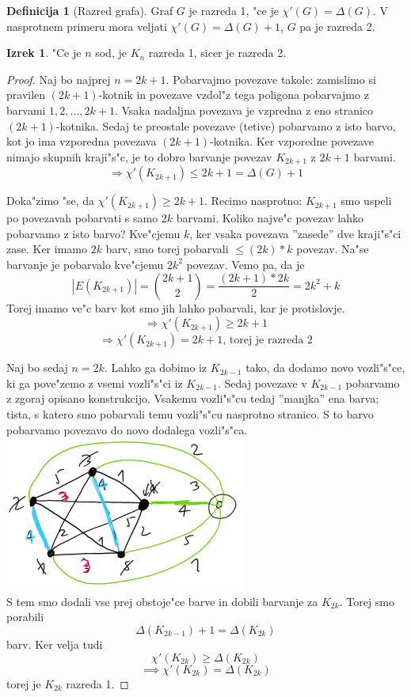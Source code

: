 \documentclass{article}
\theoremstyle{definition}
\newtheorem{definition}{Definicija}[section]
\newtheorem{theorem}{Izrek}[section]
\begin{document}
	\begin{definition}[Razred grafa]
		Graf $G$ je razreda 1, "ce je $\chi'(G) = \Delta(G)$. V nasprotnem primeru mora veljati $\chi'(G) = \Delta(G)+1$, $G$ pa je razreda 2.
	\end{definition}

	\begin{theorem}
		"Ce je $n$ sod, je $K_n$ razreda 1, sicer je razreda 2.
		\begin{proof}
			Naj bo najprej $n=2k+1$. Pobarvajmo povezave takole: zamislimo si pravilen $(2k+1)$-kotnik in povezave vzdol"z tega poligona pobarvajmo z barvami $1,2,...,2k+1$. Vsaka nadaljna povezava je vzpredna z eno stranico $(2k+1)$-kotnika. Sedaj te preostale povezave (tetive) pobarvamo z isto barvo, kot jo ima vzporedna povezava $(2k+1)$-kotnika. Ker vzporedne povezave nimajo skupnih kraji"s"c, je to dobro barvanje povezav $K_{2k+1}$ z $2k+1$ barvami.
			$$ \Rightarrow \chi'(K_{2k+1}) \leq 2k+1 = \Delta(G)+1 $$
			
			Doka"zimo "se, da $\chi'(K_{2k+1}) \geq 2k+1$.
			Recimo nasprotno: $K_{2k+1}$ smo uspeli po povezavah pobarvati s samo $2k$ barvami.
			Koliko najve"c povezav lahko pobarvamo z isto barvo? Kve"cjemu $k$, ker vsaka povezava ''zasede'' dve kraji"s"ci zase.
			Ker imamo $2k$ barv, smo torej pobarvali $\leq (2k)*k$ povezav.
			Na"se barvanje je pobarvalo kve"cjemu $2k^2$ povezav. Vemo pa, da je $$ |E(K_{2k+1})| = \binom{2k+1}{2} = \frac{(2k+1)*2k}{2} = 2k^2 + k$$
			Torej imamo ve"c barv kot smo jih lahko pobarvali, kar je protislovje.
			$$ \Rightarrow \chi'(K_{2k+1}) \geq 2k+1$$
			$$ \Rightarrow \chi'(K_{2k+1}) = 2k+1\text{, torej je razreda 2}$$
			
			Naj bo sedaj $n=2k$. Lahko ga dobimo iz $K_{2k-1}$ tako, da dodamo novo vozli"s"ce, ki ga pove"zemo z vsemi vozli"s"ci iz $K_{2k-1}$.
			Sedaj povezave v $K_{2k-1}$ pobarvamo z zgoraj opisano konstrukcijo.
			Vsakemu vozli"s"cu tedaj ''manjka'' ena barva; tista, s katero smo pobarvali temu vozli"s"cu nasprotno stranico. S to barvo pobarvamo povezavo do novo dodalega vozli"s"ca.
			\\ \includegraphics{barvanje-kn} \\
			S tem smo dodali vse prej obstoje"ce barve in dobili barvanje za $K_{2k}$. Torej smo porabili
			$$ \Delta(K_{2k-1})+1 = \Delta(K_{2k}) $$
			barv. Ker velja tudi
			$$ \chi'(K_{2k}) \geq \Delta(K_{2k})$$
			$$\implies \chi'(K_{2k}) = \Delta(K_{2k}) $$
			torej je $K_{2k}$ razreda 1.
		\end{proof}
	\end{theorem}
\end{document}
